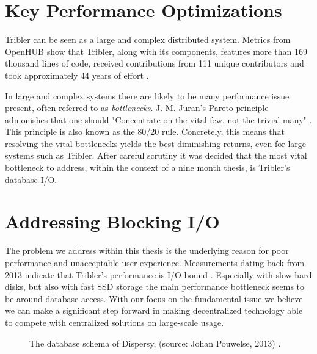 \section{Key Performance Optimizations}

Tribler can be seen as a large and complex distributed system.
Metrics from OpenHUB show that Tribler, along with its components, features more than 169 thousand lines of code, received contributions from 111 unique contributors and took approximately 44 years of effort \cite{openhub2016tribler}.

In large and complex systems there are likely to be many performance issue present, often referred to as \emph{bottlenecks}.
J. M. Juran's Pareto principle admonishes that one should "Concentrate on the vital few, not the trivial many" \cite{ammons2004finding}. This principle is also known as the 80/20 rule.
Concretely, this means that resolving the vital bottlenecks yields the best diminishing returns, even for large systems such as Tribler.
After careful scrutiny it was decided that the most vital bottleneck to address, within the context of a nine month thesis, is Tribler's database I/O.

\section{Addressing Blocking I/O}
\label{sct:triblers_database_dependency}

The problem we address within this thesis is the underlying reason for poor performance and unacceptable user experience. 
Measurements dating back from 2013 indicate that Tribler's performance is I/O-bound \cite{pouwelse2014reduce}.
Especially with slow hard disks, but also with fast SSD storage the main performance bottleneck seems to be around database access.
With our focus on the fundamental issue we believe we can make a significant step forward in making decentralized technology able to compete with centralized solutions on large-scale usage.

\begin{figure}[!h]
	\caption{The database schema of Dispersy, (source: Johan Pouwelse, 2013) \cite{pouwelse2013documentation}.}
	\label{fig:dispersy_database_schema}
\end{figure}

